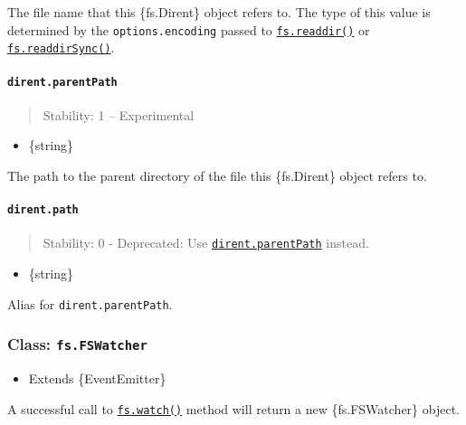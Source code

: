 The file name that this \{fs.Dirent\} object refers to. The type of this
value is determined by the \texttt{options.encoding} passed to
\hyperref[fsreaddirpath-options-callback]{\texttt{fs.readdir()}} or
\hyperref[fsreaddirsyncpath-options]{\texttt{fs.readdirSync()}}.

\paragraph{\texorpdfstring{\texttt{dirent.parentPath}}{dirent.parentPath}}\label{dirent.parentpath}

\begin{quote}
Stability: 1 -- Experimental
\end{quote}

\begin{itemize}
\tightlist
\item
  \{string\}
\end{itemize}

The path to the parent directory of the file this \{fs.Dirent\} object
refers to.

\paragraph{\texorpdfstring{\texttt{dirent.path}}{dirent.path}}\label{dirent.path}

\begin{quote}
Stability: 0 - Deprecated: Use
\hyperref[direntparentpath]{\texttt{dirent.parentPath}} instead.
\end{quote}

\begin{itemize}
\tightlist
\item
  \{string\}
\end{itemize}

Alias for \texttt{dirent.parentPath}.

\subsubsection{\texorpdfstring{Class:
\texttt{fs.FSWatcher}}{Class: fs.FSWatcher}}\label{class-fs.fswatcher}

\begin{itemize}
\tightlist
\item
  Extends \{EventEmitter\}
\end{itemize}

A successful call to
\hyperref[fswatchfilename-options-listener]{\texttt{fs.watch()}} method
will return a new \{fs.FSWatcher\} object.

